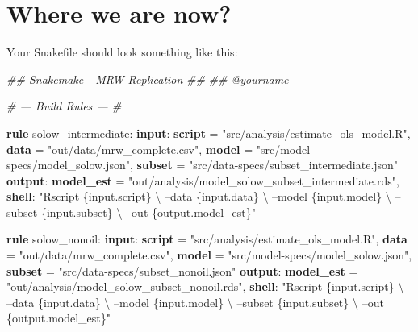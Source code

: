\documentclass[]{book}
\newenvironment{Shaded}{\begin{snugshade}}{\end{snugshade}}
\newcommand{\KeywordTok}[1]{\textcolor[rgb]{0.13,0.29,0.53}{\textbf{{#1}}}}
\newcommand{\StringTok}[1]{\textcolor[rgb]{0.31,0.60,0.02}{{#1}}}
\newcommand{\CommentTok}[1]{\textcolor[rgb]{0.56,0.35,0.01}{\textit{{#1}}}}
\newcommand{\NormalTok}[1]{{#1}}
\theoremstyle{definition}
\theoremstyle{definition}
\theoremstyle{definition}
\theoremstyle{remark}
\begin{document}
\section{Where we are now?}\label{where-we-are-now}

Your Snakefile should look something like this:

\begin{Shaded}
\begin{Highlighting}[]
\CommentTok{## Snakemake - MRW Replication}
\CommentTok{##}
\CommentTok{## @yourname}


\CommentTok{# --- Build Rules --- #}

\KeywordTok{rule} \NormalTok{solow_intermediate:}
    \KeywordTok{input}\NormalTok{:}
        \KeywordTok{script} \NormalTok{= }\StringTok{"src/analysis/estimate_ols_model.R"}\NormalTok{,}
        \KeywordTok{data}   \NormalTok{= }\StringTok{"out/data/mrw_complete.csv"}\NormalTok{,}
        \KeywordTok{model}  \NormalTok{= }\StringTok{"src/model-specs/model_solow.json"}\NormalTok{,}
        \KeywordTok{subset} \NormalTok{= }\StringTok{"src/data-specs/subset_intermediate.json"}
    \KeywordTok{output}\NormalTok{:}
        \KeywordTok{model_est} \NormalTok{= }\StringTok{"out/analysis/model_solow_subset_intermediate.rds"}\NormalTok{,}
    \KeywordTok{shell}\NormalTok{:}
        \StringTok{"Rscript \{input.script\} \textbackslash{}}
\StringTok{            --data \{input.data\} \textbackslash{}}
\StringTok{            --model \{input.model\} \textbackslash{}}
\StringTok{            --subset \{input.subset\} \textbackslash{}}
\StringTok{            --out \{output.model_est\}"}

\KeywordTok{rule} \NormalTok{solow_nonoil:}
    \KeywordTok{input}\NormalTok{:}
        \KeywordTok{script} \NormalTok{= }\StringTok{"src/analysis/estimate_ols_model.R"}\NormalTok{,}
        \KeywordTok{data}   \NormalTok{= }\StringTok{"out/data/mrw_complete.csv"}\NormalTok{,}
        \KeywordTok{model}  \NormalTok{= }\StringTok{"src/model-specs/model_solow.json"}\NormalTok{,}
        \KeywordTok{subset} \NormalTok{= }\StringTok{"src/data-specs/subset_nonoil.json"}
    \KeywordTok{output}\NormalTok{:}
        \KeywordTok{model_est} \NormalTok{= }\StringTok{"out/analysis/model_solow_subset_nonoil.rds"}\NormalTok{,}
    \KeywordTok{shell}\NormalTok{:}
        \StringTok{"Rscript \{input.script\} \textbackslash{}}
\StringTok{            --data \{input.data\} \textbackslash{}}
\StringTok{            --model \{input.model\} \textbackslash{}}
\StringTok{            --subset \{input.subset\} \textbackslash{}}
\StringTok{            --out \{output.model_est\}"}


\end{Highlighting}
\end{Shaded}
\end{document}
